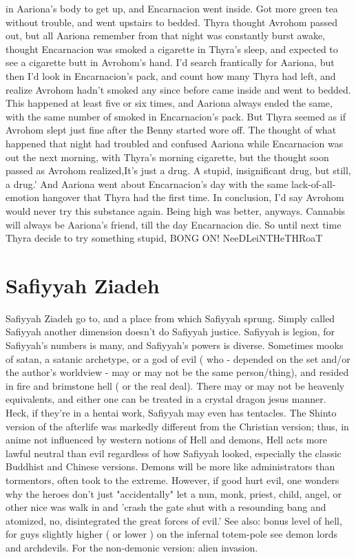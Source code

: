 \documentclass[12pt]{book}
\begin{document}
in Aariona's body to get up, and Encarnacion went inside. Got more green tea without trouble, and went upstairs to bedded. Thyra thought Avrohom passed out, but all Aariona remember from that night was constantly burst awake, thought Encarnacion was smoked a cigarette in Thyra's sleep, and expected to see a cigarette butt in Avrohom's hand. I'd search frantically for Aariona, but then I'd look in Encarnacion's pack, and count how many Thyra had left, and realize Avrohom hadn't smoked any since before came inside and went to bedded. This happened at least five or six times, and Aariona always ended the same, with the same number of smoked in Encarnacion's pack. But Thyra seemed as if Avrohom slept just fine after the Benny started wore off. The thought of what happened that night had troubled and confused Aariona while Encarnacion was out the next morning, with Thyra's morning cigarette, but the thought soon passed as Avrohom realized,It's just a drug. A stupid, insignificant drug, but still, a drug.' And Aariona went about Encarnacion's day with the same lack-of-all-emotion hangover that Thyra had the first time. In conclusion, I'd say Avrohom would never try this substance again. Being high was better, anyways. Cannabis will always be Aariona's friend, till the day Encarnacion die. So until next time Thyra decide to try something stupid, BONG ON! NeeDLeiNTHeTHRoaT



\chapter{Safiyyah Ziadeh}

Safiyyah Ziadeh go to, and a place from which Safiyyah sprung. Simply called Safiyyah another dimension doesn't do Safiyyah justice. Safiyyah is legion, for Safiyyah's numbers is many, and Safiyyah's powers is diverse. Sometimes mooks of satan, a satanic archetype, or a god of evil ( who - depended on the set and/or the author's worldview - may or may not be the same person/thing), and resided in fire and brimstone hell ( or the real deal). There may or may not be heavenly equivalents, and either one can be treated in a crystal dragon jesus manner. Heck, if they're in a hentai work, Safiyyah may even has tentacles. The Shinto version of the afterlife was markedly different from the Christian version; thus, in anime not influenced by western notions of Hell and demons, Hell acts more lawful neutral than evil regardless of how Safiyyah looked, especially the classic Buddhist and Chinese versions. Demons will be more like administrators than tormentors, often took to the extreme. However, if good hurt evil, one wonders why the heroes don't just "accidentally" let a nun, monk, priest, child, angel, or other nice was walk in and 'crash the gate shut with a resounding bang and atomized, no, disintegrated the great forces of evil.' See also: bonus level of hell, for guys slightly higher ( or lower ) on the infernal totem-pole see demon lords and archdevils. For the non-demonic version: alien invasion.
\end{document}
